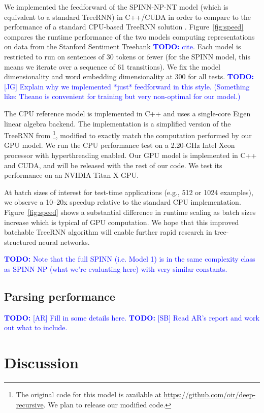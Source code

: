 \documentclass[11pt]{article}
\newcommand\todo[1]{\textcolor{blue}{\textbf{TODO:} #1}}
\begin{document}
We implemented the feedforward of the SPINN-NP-NT model (which is equivalent to a standard TreeRNN) in C++/CUDA in order to compare to the performance of a standard CPU-based TreeRNN solution \cite{irsoy2014deep}. Figure~\ref{fig:speed} compares the runtime performance of the two models computing representations on data from the Stanford Sentiment Treebank \todo{cite}. Each model is restricted to run on sentences of 30 tokens or fewer (for the SPINN model, this means we iterate over a sequence of 61 transitions). We fix the model dimensionality and word embedding dimensionality at 300 for all tests. \todo{[JG] Explain why we implemented *just* feedforward in this style. (Something like: Theano is convenient for training but very non-optimal for our model.)}

The CPU reference model is implemented in C++ and uses a single-core Eigen linear algebra backend. The implementation is a simplified version of the TreeRNN from \citealt{irsoy2014deep}\footnote{The original code for this model is available at \url{https://github.com/oir/deep-recursive}. We plan to release our modified code.}, modified to exactly match the computation performed by our GPU model. We run the CPU performance test on a 2.20-GHz Intel Xeon processor with hyperthreading enabled. Our GPU model is implemented in C++ and CUDA, and will be released with the rest of our code. We test its performance on an NVIDIA Titan X GPU.

At batch sizes of interest for test-time applications (e.g., 512 or 1024 examples), we observe a 10--20x speedup relative to the standard CPU implementation. Figure~\ref{fig:speed} shows a substantial difference in runtime scaling as batch sizes increase which is typical of GPU computation. We hope that this improved batchable TreeRNN algorithm will enable further rapid research in tree-structured neural networks.

\todo{Note that the full SPINN (i.e. Model 1) is in the same complexity class as SPINN-NP (what we're evaluating here) with very similar constants.}

\subsection{Parsing performance}

\todo{[AR] Fill in some details here.}
\todo{[SB] Read AR's report and work out what to include.}

\section{Discussion}
\end{document}
